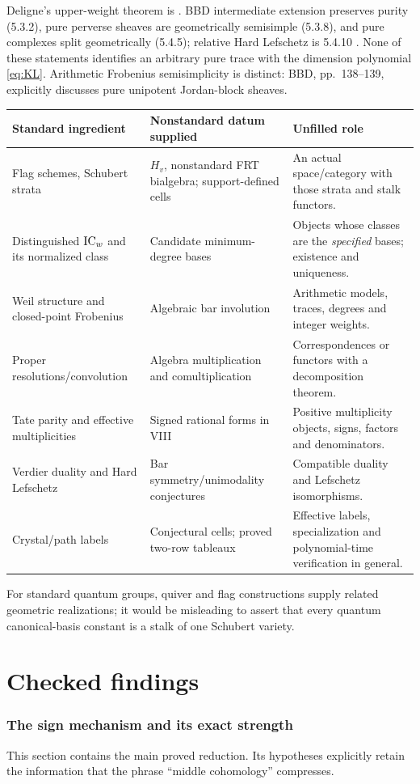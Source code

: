 \documentclass[11pt,a4paper]{article}
\theoremstyle{named}\newtheorem{finding}{Finding}[section]
\theoremstyle{definition}\newtheorem{definition}[finding]{Definition}
\theoremstyle{remark}\newtheorem{remark}[finding]{Remark}
\begin{document}
Deligne's upper-weight theorem is \cite[Theorem 3.3.1; Corollaries 3.3.4--3.3.6]{WeilII}. BBD intermediate extension preserves purity (5.3.2), pure perverse sheaves are geometrically semisimple (5.3.8), and pure complexes split geometrically (5.4.5); relative Hard Lefschetz is 5.4.10 \cite{BBD}. None of these statements identifies an arbitrary pure trace with the dimension polynomial \eqref{eq:KL}. Arithmetic Frobenius semisimplicity is distinct: BBD, pp.~138--139, explicitly discusses pure unipotent Jordan-block sheaves.

{\small\begin{longtable}{p{.25\linewidth}p{.29\linewidth}p{.38\linewidth}}
\toprule Standard ingredient&Nonstandard datum supplied&Unfilled role\\\midrule\endhead
Flag schemes, Schubert strata&$H_v$, nonstandard FRT bialgebra; support-defined cells&An actual space/category with those strata and stalk functors.\\
Distinguished $\operatorname{IC}_w$ and its normalized class&Candidate minimum-degree bases&Objects whose classes are the \emph{specified} bases; existence and uniqueness.\\
Weil structure and closed-point Frobenius&Algebraic bar involution&Arithmetic models, traces, degrees and integer weights.\\
Proper resolutions/convolution&Algebra multiplication and comultiplication&Correspondences or functors with a decomposition theorem.\\
Tate parity and effective multiplicities&Signed rational forms in VIII&Positive multiplicity objects, signs, factors and denominators.\\
Verdier duality and Hard Lefschetz&Bar symmetry/unimodality conjectures&Compatible duality and Lefschetz isomorphisms.\\
Crystal/path labels&Conjectural cells; proved two-row tableaux&Effective labels, specialization and polynomial-time verification in general.\\\bottomrule
\end{longtable}}
For standard quantum groups, quiver and flag constructions supply related geometric realizations; it would be misleading to assert that every quantum canonical-basis constant is a stalk of one Schubert variety.

\part{Checked findings}
\section{The sign mechanism and its exact strength}\label{sec:main}
This section contains the main proved reduction. Its hypotheses explicitly retain the information that the phrase ``middle cohomology'' compresses.
\end{document}
